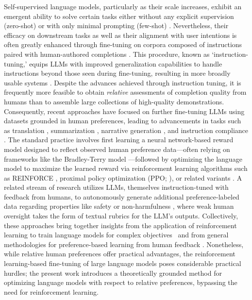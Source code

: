 Self-supervised language models, particularly as their scale increases, exhibit an emergent ability to solve certain tasks either without any explicit supervision (zero-shot) \citep{radford2019language} or with only minimal prompting (few-shot) \citep{gpt3,megatron,chowdhery2022palm}. Nevertheless, their efficacy on downstream tasks as well as their alignment with user intentions is often greatly enhanced through fine-tuning on corpora composed of instructions paired with human-authored completions \citep{mishra-etal-2022-cross,sanh2022multitask,chung2022scaling,thoppilan2022lamda}. This procedure, known as `instruction-tuning,' equips LLMs with improved generalization capabilities to handle instructions beyond those seen during fine-tuning, resulting in more broadly usable systems \citep{chung2022scaling}. Despite the advances achieved through instruction tuning, it is frequently more feasible to obtain \textit{relative} assessments of completion quality from humans than to assemble large collections of high-quality demonstrations. Consequently, recent approaches have focused on further fine-tuning LLMs using datasets grounded in human preferences, leading to advancements in tasks such as translation \citep{kreutzer-etal-2018-reliability}, summarization \citep{stiennon2022learning,ziegler2020finetuning}, narrative generation \citep{ziegler2020finetuning}, and instruction compliance \citep{ouyang2022training,ramamurthy2023is}. The standard practice involves first learning a neural network-based reward model designed to reflect observed human preference data—often relying on frameworks like the Bradley-Terry model \citep{bradley1952rankanalysis}—followed by optimizing the language model to maximize the learned reward via reinforcement learning algorithms such as REINFORCE \citep{williams1992reinforce}, proximal policy optimization (PPO; \cite{schulman2017proximal}), or related variants \citep{ramamurthy2023is}. A related stream of research utilizes LLMs, themselves instruction-tuned with feedback from humans, to autonomously generate additional preference-labeled data regarding properties like safety or non-harmfulness \citep{bai2022constitutional}, where weak human oversight takes the form of textual rubrics for the LLM’s outputs. Collectively, these approaches bring together insights from the application of reinforcement learning to train language models for complex objectives~\citep{Ranzato2015SequenceLT,paulus2018a,wu2018learning} and from general methodologies for preference-based learning from human feedback \citep{christiano2017deep,kupcsik2018learning}. Nonetheless, while relative human preferences offer practical advantages, the reinforcement learning-based fine-tuning of large language models poses considerable practical hurdles; the present work introduces a theoretically grounded method for optimizing language models with respect to relative preferences, bypassing the need for reinforcement learning.

